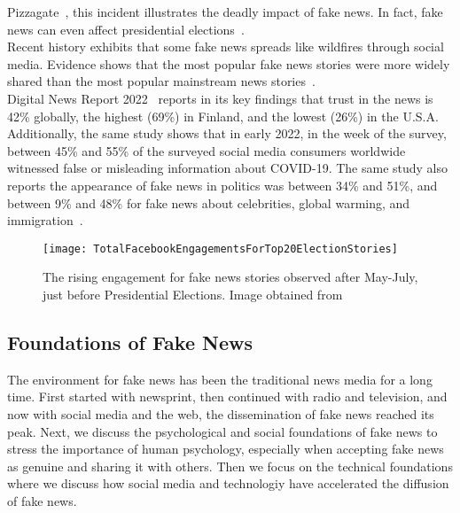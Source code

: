 Pizzagate~\parencite{Pizzagate_Fisher}, this incident illustrates the deadly impact of fake news. In fact, fake news can even affect presidential elections~\parencite{SocialMediaAndFakeNewsIn2016Election_Allcott, TrumpWonBecauseOfFacebook_Read}.\\
Recent history exhibits that some fake news spreads like wildfires through social media. Evidence shows that the most popular fake news stories
were more widely shared than the most popular mainstream news stories~\parencite{Buzzfeed_FakeNewsOutperformRealNews_Silverman}.\\
Digital News Report 2022~\parencite{ReutersInstituteDigitalNewsReport} reports in its key findings that trust in the news is 42\% globally,
the highest (69\%) in Finland, and the lowest (26\%) in the U.S.A. Additionally, the same study shows that in early 2022, in the week of the
survey, between 45\% and 55\% of the surveyed social media consumers worldwide witnessed false or misleading information about COVID-19. The
same study also reports the appearance of fake news in politics was between 34\% and 51\%, and between 9\% and 48\% for fake news about
celebrities, global warming, and immigration~\parencite{StatistaUsageOfSocialMedia_Watson}.
\begin{figure}
    \centering
    \texttt{[image: TotalFacebookEngagementsForTop20ElectionStories]}
    \caption[Total Facebook Engagements for Top 20 Election Stories]{The rising engagement for fake news stories observed after May-July, just before Presidential Elections. Image obtained from~\parencite{Buzzfeed_FakeNewsOutperformRealNews_Silverman}}\label{fig:TotalFacebookEngagementsForTop20ElectionStories}
\end{figure}
\subsection{Foundations of Fake News}
\label{subsec:fakeNewsDetection_FoundationsOfFakeNews}
The environment for fake news has been the traditional news media for a long time. First started with newsprint, then continued with radio
and television, and now with social media and the web, the dissemination of fake news reached its peak. Next, we discuss the psychological
and social foundations of fake news to stress the importance of human psychology, especially when accepting fake news as genuine and sharing
it with others. Then we focus on the technical foundations where we discuss how social media and technologiy have accelerated the diffusion of
fake news.\\

